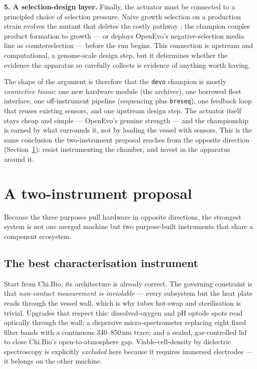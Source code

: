 \documentclass[11pt,a4paper]{article}
\newcommand{\code}[1]{\texttt{\small #1}}
\begin{document}
\textbf{5. A selection-design layer.} Finally, the actuator must be connected to a principled
choice of selection pressure. Naive growth selection on a production strain evolves the mutant
that deletes the costly pathway \cite{sandberg2019ale}; the champion couples product formation
to growth --- or deploys OpenEvo's negative-selection media line as counterselection --- before
the run begins. This connection is upstream and computational, a genome-scale design step, but it
determines whether the evidence the apparatus so carefully collects is evidence of anything worth
having.

The shape of the argument is therefore that the \texttt{devo} champion is mostly
\emph{connective tissue}: one new hardware module (the archiver), one borrowed fleet interface,
one off-instrument pipeline (sequencing plus \code{breseq}), one feedback loop that reuses
existing sensors, and one upstream design step. The actuator itself stays cheap and
simple --- OpenEvo's genuine strength --- and the championship is earned by what surrounds it,
not by loading the vessel with sensors. This is the same conclusion the two-instrument proposal
reaches from the opposite direction (Section~\ref{sec:proposal}): resist instrumenting the
chamber, and invest in the apparatus around it.

\section{A two-instrument proposal}
\label{sec:proposal}

Because the three purposes pull hardware in opposite directions, the strongest system is not
one merged machine but two purpose-built instruments that share a component ecosystem.

\subsection{The best characterisation instrument}
Start from Chi.Bio; its architecture is already correct. The governing constraint is that
\emph{non-contact measurement is inviolable} --- every subsystem but the heat plate reads
through the vessel wall, which is why tubes hot-swap and sterilisation is trivial. Upgrades
that respect this: dissolved-oxygen and pH optode spots read optically through the wall; a
dispersive micro-spectrometer replacing eight fixed filter bands with a continuous
340--850\,nm trace; and a sealed, gas-controlled lid to close Chi.Bio's open-to-atmosphere
gap. Viable-cell-density by dielectric spectroscopy is explicitly \emph{excluded} here because
it requires immersed electrodes --- it belongs on the other machine.
\end{document}

